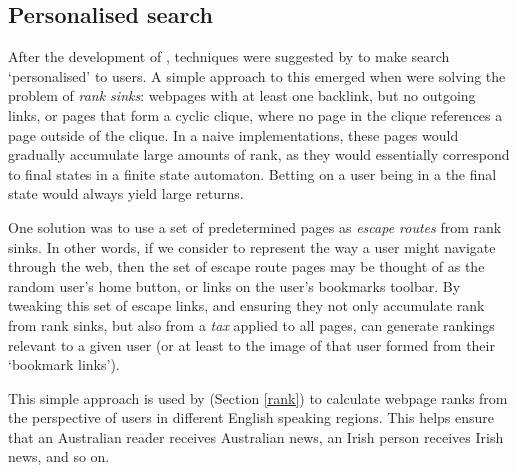 \subsection{Personalised search}
After the development of \pr{} \cite{page1998}, techniques
were suggested by  to make search `personalised' to users.
A simple approach to this emerged when \citeauthor{page1999} were
solving the
problem of {\it rank sinks}: webpages with at least one backlink, but
no outgoing links, or pages that form a cyclic clique, where no page
in the clique references a page outside of the clique.  In a naive
\pr{} implementations, these pages would gradually accumulate large
amounts of rank, as they would essentially correspond to final states
in a finite state automaton.  Betting on a user being in a
the final state would always yield large returns.

One solution was
to use a set of predetermined pages as {\it escape routes} from rank
sinks.  In other words, if we consider \pr{} to represent the way a
user might navigate through the web, then the set of escape route pages
may be thought of as the random user's home button, or links on the user's
bookmarks toolbar. By tweaking this set of escape links, and ensuring
they not only accumulate rank from rank sinks, but also from a {\it tax}
applied to all pages, \pr{} can generate rankings relevant to a
given user (or at least to the image of that user formed from their
`bookmark links').

This simple approach is used by \nr{}
(Section \ref{rank}) to calculate webpage ranks from the perspective
of users in different English speaking regions.  This helps ensure that an
Australian reader receives Australian news, an Irish person receives
Irish news, and so on.
